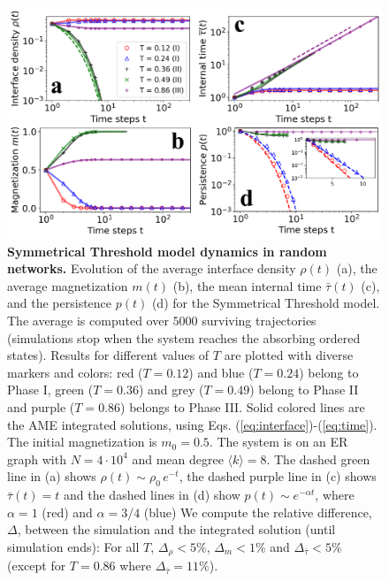 	\begin{figure}[t]
		\centering
		\includegraphics[width=\textwidth]{Figs/Aging_STM/FIG3.pdf}
		\caption{\label{fig:evolution_random} \textbf{Symmetrical Threshold model dynamics in random networks.} Evolution of the average interface density $\rho(t)$ (a), the average magnetization $m(t)$ (b), the mean internal time $\bar{\tau}(t)$ (c), and the persistence $p(t)$ (d) for the Symmetrical Threshold model. The average is computed over $5000$ surviving trajectories (simulations stop when the system reaches the absorbing ordered states). Results for different values of $T$ are plotted with diverse markers and colors: red ($T = 0.12$) and blue ($T = 0.24$) belong to Phase I, green ($T = 0.36$) and grey ($T = 0.49$) belong to Phase II and purple ($T = 0.86$) belongs to Phase III. Solid colored lines are the AME integrated solutions, using Eqs. (\ref{eq:interface})-(\ref{eq:time}). The initial magnetization is $m_0 = 0.5$. The system is on an ER graph with $N = 4 \cdot 10^4$ and mean degree $\langle k \rangle = 8$. The dashed green line in (a) shows $\rho(t) \sim \rho_0 \, e^{-t}$, the dashed purple line in (c) shows $\bar{\tau}(t) = t$ and the dashed lines in (d) show $p(t) \sim e^{-\alpha t}$, where $\alpha = 1$ (red) and $\alpha = 3/4$ (blue) 
		We compute the relative difference, $\Delta$, between the simulation and the integrated solution  (until simulation ends): For all $T$, $\Delta_{\rho} < 5\%$, $\Delta_{m} < 1\%$ and $\Delta_{\bar{\tau}} < 5\%$ (except for $T = 0.86$ where $\Delta_{\bar{\tau}} = 11\%$).}
	\end{figure}
	
